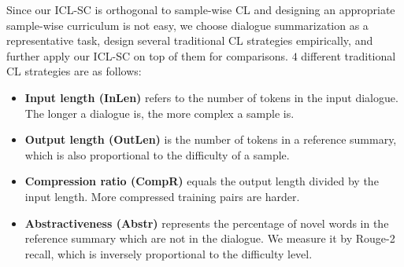 Since our ICL-SC is orthogonal to sample-wise CL and designing an appropriate sample-wise curriculum is not easy, we choose dialogue summarization as a representative task, design several traditional CL strategies empirically, and further apply our ICL-SC on top of them for comparisons.
$4$ different traditional CL strategies are as follows:
\begin{itemize}
	\item \textbf{Input length (InLen)} refers to the number of tokens in the input dialogue. The longer a dialogue is, the more complex a sample is.
	\item \textbf{Output length (OutLen)} is the number of tokens in a reference summary, which is also proportional to the difficulty of a sample.
	\item \textbf{Compression ratio (CompR)} equals the output length divided by the input length. More compressed training pairs are harder.%
	\item \textbf{Abstractiveness (Abstr)} represents the percentage of novel words in the reference summary which are not in the dialogue. We measure it by Rouge-2 recall, which is inversely proportional to the difficulty level.
\end{itemize}

